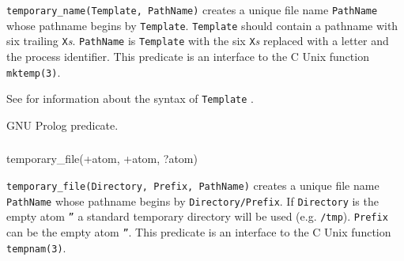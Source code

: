 \texttt{temporary\_name(Template, PathName)} creates a unique file name
\texttt{PathName} whose pathname begins by \texttt{Template}.
\texttt{Template} should contain a pathname with six trailing
\texttt{X}\emph{s}. \texttt{PathName} is \texttt{Template} with the six
\texttt{X}\emph{s} replaced with a letter and the process identifier. This
predicate is an interface to the C Unix function \texttt{mktemp(3)}.

See  for information about the syntax of
\texttt{Template} .

\begin{PlErrors}






\end{PlErrors}

\Portability

GNU Prolog predicate.

\subsubsection{}

\begin{TemplatesOneCol}
temporary\_file(+atom, +atom, ?atom)

\end{TemplatesOneCol}

\Description

\texttt{temporary\_file(Directory, Prefix, PathName)} creates a unique file
name \texttt{PathName} whose pathname begins by \texttt{Directory/Prefix}.
If \texttt{Directory} is the empty atom \texttt{''} a standard temporary
directory will be used (e.g. \texttt{/tmp}). \texttt{Prefix} can be the
empty atom \texttt{''}. This predicate is an interface to the C Unix
function \texttt{tempnam(3)}.

